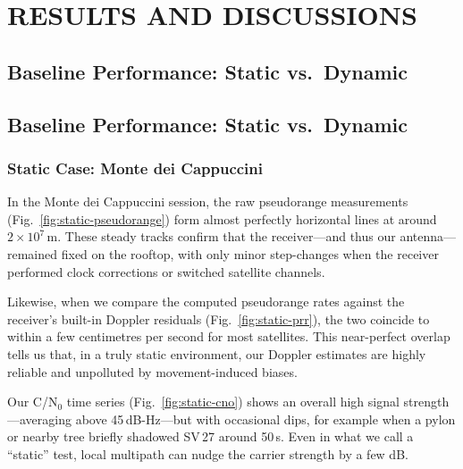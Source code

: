 
\section{RESULTS AND DISCUSSIONS} \label{sec:results}



    \subsection{Baseline Performance: Static vs.\ Dynamic}
    


        \subsection{Baseline Performance: Static vs.\ Dynamic}

            \subsubsection{Static Case: Monte dei Cappuccini}
            
            In the Monte dei Cappuccini session, the raw pseudorange measurements (Fig.~\ref{fig:static-pseudorange}) form almost perfectly horizontal lines at around $2\times10^{7}$\,m. These steady tracks confirm that the receiver—and thus our antenna—remained fixed on the rooftop, with only minor step-changes when the receiver performed clock corrections or switched satellite channels.
            
            Likewise, when we compare the computed pseudorange rates against the receiver's built-in Doppler residuals (Fig.~\ref{fig:static-prr}), the two coincide to within a few centimetres per second for most satellites. This near-perfect overlap tells us that, in a truly static environment, our Doppler estimates are highly reliable and unpolluted by movement-induced biases.
            
            Our C/N$_0$ time series (Fig.~\ref{fig:static-cno}) shows an overall high signal strength—averaging above 45\,dB-Hz—but with occasional dips, for example when a pylon or nearby tree briefly shadowed SV\,27 around 50\,s. Even in what we call a “static” test, local multipath can nudge the carrier strength by a few dB.
            
